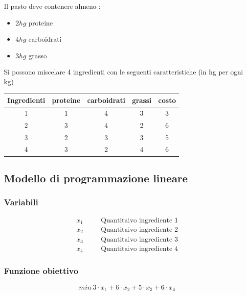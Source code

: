 Il pasto deve contenere almeno :
\begin{itemize}
    \item $2hg$ proteine
    \item $4hg$ carboidrati
    \item $3hg$ grasso
\end{itemize}

Si possono miscelare 4 ingredienti con le seguenti caratteristiche (in hg per ogni kg)

\vspace{0.5cm}

\begin{center}
    \begin{tabular}{|c|c|c|c|c|}
        \hline Ingredienti & proteine & carboidrati & grassi & costo \\ \hline 1 & 1 & 4 & 3 & 3 \\ \hline
        2 & 3 & 4 & 2 & 6 \\ \hline
        3 & 2& 3& 3& 5 \\ \hline
        4 & 3 & 2 & 4& 6 \\ \hline
    \end{tabular}
\end{center}

\vspace{0.5cm}

\subsection{Modello di programmazione lineare}
\subsubsection{Variabili}
$$
    \begin{aligned}
        x_1 && \quad \text{Quantitaivo ingrediente 1} \\
        x_2 && \quad \text{Quantitaivo ingrediente 2} \\
        x_3 && \quad \text{Quantitaivo ingrediente 3} \\
        x_4 && \quad \text{Quantitaivo ingrediente 4} 
    \end{aligned}
$$

\subsubsection{Funzione obiettivo}
{
    \large
    $$
    min\ 3 \cdot x_1 + 6 \cdot x_2 + 5 \cdot x_3 + 6 \cdot x_4
    $$
}

